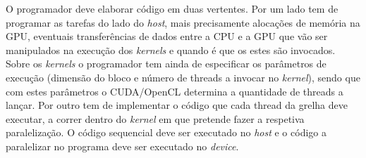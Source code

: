  O programador deve elaborar código em duas vertentes. Por um lado tem de programar as tarefas do lado do \textit{host}, mais precisamente alocações de memória na GPU, eventuais transferências de dados entre a CPU e a GPU que vão ser manipulados na execução dos \textit{kernels} e quando é que os estes são invocados. Sobre os \textit{kernels} o programador tem ainda de especificar os parâmetros de execução (dimensão do bloco e número de threads a invocar no \textit{kernel}), sendo que com estes parâmetros o CUDA/OpenCL determina a quantidade de threads a lançar. Por outro tem de implementar o código que cada thread da grelha deve executar, a correr dentro do \textit{kernel} em que pretende fazer a respetiva paralelização. O código sequencial deve ser executado no \textit{host} e o código a paralelizar no programa deve ser executado no \textit{device}.



